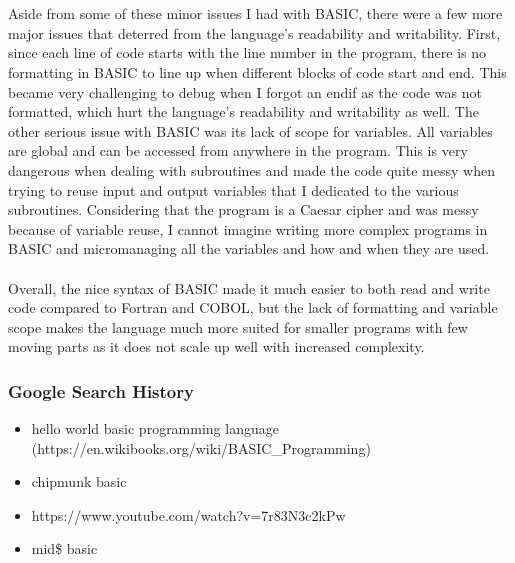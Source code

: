 \documentclass[letterpaper, 10pt, DIV=13]{scrartcl}
\numberwithin{equation}{section}
\numberwithin{figure}{section}
\numberwithin{table}{section}
\begin{document}
\\ \\
Aside from some of these minor issues I had with BASIC, there were a few more major issues that deterred from the language's readability and writability. First, since each line of code starts with the line number in the program, there is no formatting in BASIC to line up when different blocks of code start and end. This became very challenging to debug when I forgot an endif as the code was not formatted, which hurt the language's readability and writability as well. The other serious issue with BASIC was its lack of scope for variables. All variables are global and can be accessed from anywhere in the program. This is very dangerous when dealing with subroutines and made the code quite messy when trying to reuse input and output variables that I dedicated to the various subroutines. Considering that the program is a Caesar cipher and was messy because of variable reuse, I cannot imagine writing more complex programs in BASIC and micromanaging all the variables and how and when they are used.
\\ \\
Overall, the nice syntax of BASIC made it much easier to both read and write code compared to Fortran and COBOL, but the lack of formatting and variable scope makes the language much more suited for smaller programs with few moving parts as it does not scale up well with increased complexity.

\subsubsection{Google Search History}
\begin{itemize}
	\item hello world basic programming language (https://en.wikibooks.org/wiki/BASIC\_Programming)
	\item chipmunk basic
	\item https://www.youtube.com/watch?v=7r83N3c2kPw
	\item mid\$ basic 
\end{itemize}
\end{document}
